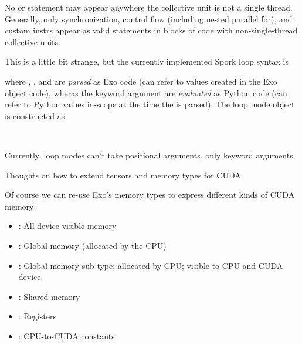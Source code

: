 \filbreak
No  or  statement may appear anywhere the collective unit is not a single thread.
Generally, only synchronization, control flow (including nested parallel for), and custom instrs appear as valid statements in blocks of code with non-single-thread collective units.

\filbreak
{}

This is a little bit strange, but the currently implemented Spork loop syntax is


where , , and  are \textit{parsed} as Exo code (can refer to values created in the Exo object code), wheras the keyword argument  are \textit{evaluated} as Python code (can refer to Python values in-scope at the time the  is parsed).
The loop mode object is constructed as

\filbreak
{}\\

\filbreak
Currently, loop modes can't take positional arguments, only keyword arguments.


\filbreak
{}

Thoughts on how to extend tensors and memory types for CUDA.

 Of course we can re-use Exo's memory types to express different kinds of CUDA memory:
\begin{itemize}
  \item {}: All device-visible memory
  \item {}: Global memory (allocated by the CPU)
  \item {}: Global memory sub-type; allocated by CPU; visible to CPU and CUDA device.
  \item {}: Shared memory
  \item {}: Registers
  \item {}: CPU-to-CUDA constants
\end{itemize}

